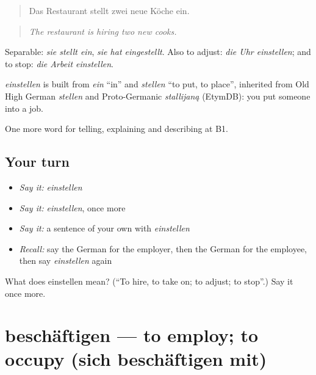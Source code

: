 \begin{quote}
Das Restaurant stellt zwei neue Köche ein.
\end{quote}

\begin{quote}
\emph{The restaurant is hiring two new cooks.}
\end{quote}

Separable: \emph{sie stellt ein}, \emph{sie hat eingestellt}. Also to adjust: \emph{die Uhr einstellen}; and to stop: \emph{die Arbeit einstellen}.

\begin{cousinweb}
\emph{einstellen} is built from \emph{ein} \textquotedblleft{}in\textquotedblright{} and \emph{stellen} \textquotedblleft{}to put, to place\textquotedblright{}, inherited from Old High German \emph{stellen} and Proto-Germanic \emph{stallijaną} (EtymDB): you put someone into a job.
\end{cousinweb}

\begin{grammarlens}[title={What you've built}]
One more word for telling, explaining and describing at B1.
\end{grammarlens}

\subsection*{Your turn}
\begin{itemize}
\raggedright
  \item \emph{Say it:} \emph{einstellen}
  \item \emph{Say it:} \emph{einstellen}, once more
  \item \emph{Say it:} a sentence of your own with \emph{einstellen}
  \item \emph{Recall:} say the German for the employer, then the German for the employee, then say \emph{einstellen} again
\end{itemize}

\begin{tcolorbox}[breakable,colback=teal!4,colframe=teal!35!black,title={Before you move on}]
What does einstellen mean? (\textquotedblleft{}To hire, to take on; to adjust; to stop\textquotedblright{}.) Say it once more.
\end{tcolorbox}
\section[beschäftigen]{beschäftigen — to employ; to occupy (sich beschäftigen mit)}

